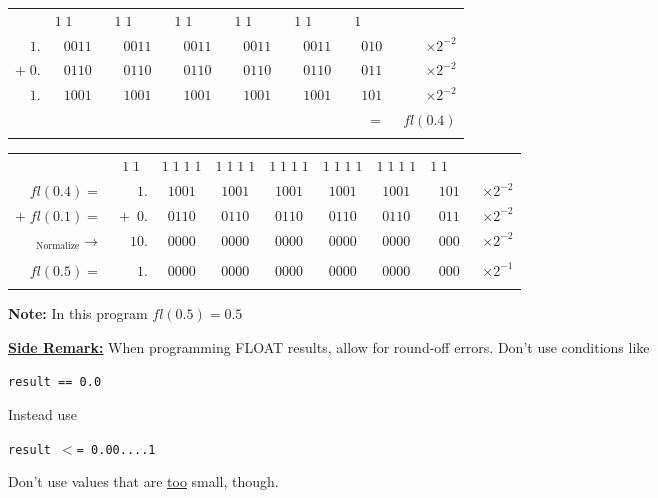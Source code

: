 \documentclass[a4paper,12pt,]{report}
\begin{document}
\begin{center}
	\begin{tabular}{rccccccr}
		&  \tiny{$1\;1\qquad\!$} & \tiny{$1\;1\qquad\!$} &  \tiny{$1\;1\qquad\!$} 
			& \tiny{$1\;1\qquad\!$} & \tiny{$1\;1\qquad\!$} & \tiny{$1\qquad \!$} & \\
		$1.$ & $\!0011$ & $0011$ & $0011$ & $0011$ & $0011$ & $010$ & $\times2^{-2}$\\
		$+\;0.$ & $\!0110$ & $0110$ & $0110$ & $0110$ & $0110$ & $011$ & $\times2^{-2}$\\
		\hline
		$1.$ & $\!1001$ & $1001$ & $1001$ & $1001$ & $1001$ & $101$ & $\times2^{-2}$\\
		&&&&&&$\;\;=$& $\! \! \! \!fl(0.4)$\\ \\
	\end{tabular}

	\bigskip

	\begin{tabular}{rrccccccr}
		&\tiny{$1\;1\;\;$} &  \tiny{$1\;1\;1\;1$} & \tiny{$1\;1\;1\;1$} &  \tiny{$1\;1\;1\;1$} 
			& \tiny{$1\;1\;1\;1$}& \tiny{$1\;1\;1\;1$} & \tiny{$1\;1\quad \;\,$} & \\
		$fl(0.4)=$ & $1.$ & $\!1001$ & $1001$ & $1001$ & $1001$ & $1001$ & $101$
			& $\times2^{-2}$\\
		$+\;fl(0.1)=$ & $\!+\;0.$ & $\!0110$ & $0110$ & $0110$ & $0110$ & $0110$ & $011$ 
			& $\times2^{-2}$\\
		\hline
		$_{\text{Normalize}}\rightarrow$& $10.$ & $\!0000$ & $0000$ & $0000$ & $0000$ 
			& $0000$ & $000$ & $\times2^{-2}$\\ \\

		$fl(0.5)=$ & $1.$ & $\!0000$ & $0000$ & $0000$ & $0000$ & $0000$ & $000$ 
			& $\times2^{-1}$\\ \\
	\end{tabular}
\end{center}

	\textbf{Note:} In this program $fl(0.5)= 0.5$

\begin{center}
\fbox
{
	\parbox{0.5\textwidth}
	{
			\textbf{\underline{Side Remark:}} When programming FLOAT results, allow for round-off 
			errors. Don't use conditions like
			\begin{center}
				\texttt{result == 0.0}
			\end{center}
			Instead use
			\begin{center}
				\texttt{result $<$= 0.00....1}
			\end{center}
			Don't use values that are \underline{too} small, though.
	}
}
\end{center}
\end{document}
